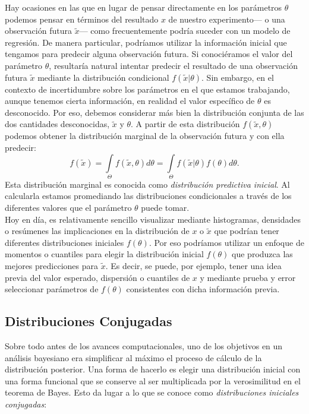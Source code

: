 Hay ocasiones en las que en lugar de pensar directamente en los parámetros $\theta$ podemos pensar en términos del resultado $x$ de nuestro experimento--- o una observación futura $\tilde{x}$--- como frecuentemente podría suceder con un modelo de regresión. De manera particular, podríamos utilizar la información inicial que tengamos para predecir alguna observación futura. Si conociéramos el valor del parámetro $\theta$, resultaría natural intentar predecir el resultado de una observación futura $\tilde{x}$ mediante la distribución condicional $f(\tilde{x}|\theta)$. Sin embargo, en el contexto de incertidumbre sobre los parámetros en el que estamos trabajando, aunque tenemos cierta información, en realidad el valor específico de $\theta$ es desconocido. Por eso, debemos considerar más bien la distribución conjunta de las dos cantidades desconocidas, $\tilde{x}$ y $\theta$. A partir de esta distribución $f(\tilde{x},\theta)$ podemos obtener la distribución marginal de la observación futura y con ella predecir: 
\begin{equation*} 
f(\tilde{x})=\int\limits_\Theta f(\tilde{x},\theta)d\theta=\int\limits_\Theta f(\tilde{x}|\theta)f(\theta)d\theta.
\end{equation*}
Esta distribución marginal es conocida como \textit{distribución predictiva inicial}. Al calcularla estamos promediando las distribuciones condicionales a través de los diferentes valores que el parámetro $\theta$ puede tomar.\\

Hoy en día, es relativamente sencillo visualizar mediante histogramas, densidades o resúmenes las implicaciones en la distribución de $x$ o $\tilde{x}$ que podrían tener diferentes distribuciones iniciales $f(\theta)$. Por eso podríamos utilizar un enfoque de momentos o cuantiles para elegir la distribución inicial $f(\theta)$ que produzca las mejores predicciones para $\tilde{x}$. Es decir, se puede, por ejemplo, tener una idea previa del valor esperado, dispersión o cuantiles de $x$ y mediante prueba y error seleccionar parámetros de $f(\theta)$ consistentes con dicha información previa.\\

\subsection{Distribuciones Conjugadas}

Sobre todo antes de los avances computacionales, uno de los objetivos en un análisis bayesiano era simplificar al máximo el proceso de cálculo de la distribución posterior. Una forma de hacerlo es elegir una distribución inicial con una forma funcional que se conserve al ser multiplicada por la verosimilitud en el teorema de Bayes. Esto da lugar a lo que se conoce como \textit{distribuciones iniciales conjugadas}: 

